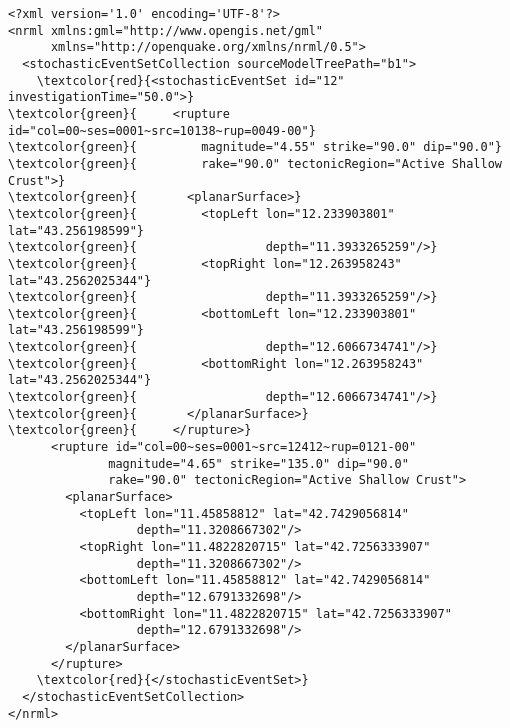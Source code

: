 \begin{Verbatim}[frame=single, commandchars=\\\{\}, fontsize=\small]
<?xml version='1.0' encoding='UTF-8'?>
<nrml xmlns:gml="http://www.opengis.net/gml"
	  xmlns="http://openquake.org/xmlns/nrml/0.5">
  <stochasticEventSetCollection sourceModelTreePath="b1">
    \textcolor{red}{<stochasticEventSet id="12" investigationTime="50.0">}
\textcolor{green}{     <rupture id="col=00~ses=0001~src=10138~rup=0049-00"}
\textcolor{green}{         magnitude="4.55" strike="90.0" dip="90.0"}
\textcolor{green}{         rake="90.0" tectonicRegion="Active Shallow Crust">}
\textcolor{green}{       <planarSurface>}
\textcolor{green}{         <topLeft lon="12.233903801" lat="43.256198599"}
\textcolor{green}{                  depth="11.3933265259"/>}
\textcolor{green}{         <topRight lon="12.263958243" lat="43.2562025344"}
\textcolor{green}{                  depth="11.3933265259"/>}
\textcolor{green}{         <bottomLeft lon="12.233903801" lat="43.256198599"}
\textcolor{green}{                  depth="12.6066734741"/>}
\textcolor{green}{         <bottomRight lon="12.263958243" lat="43.2562025344"}
\textcolor{green}{                  depth="12.6066734741"/>}
\textcolor{green}{       </planarSurface>}
\textcolor{green}{     </rupture>}
      <rupture id="col=00~ses=0001~src=12412~rup=0121-00"
              magnitude="4.65" strike="135.0" dip="90.0"
              rake="90.0" tectonicRegion="Active Shallow Crust">
        <planarSurface>
          <topLeft lon="11.45858812" lat="42.7429056814"
                  depth="11.3208667302"/>
          <topRight lon="11.4822820715" lat="42.7256333907"
                  depth="11.3208667302"/>
          <bottomLeft lon="11.45858812" lat="42.7429056814"
                  depth="12.6791332698"/>
          <bottomRight lon="11.4822820715" lat="42.7256333907"
                  depth="12.6791332698"/>
        </planarSurface>
      </rupture>
    \textcolor{red}{</stochasticEventSet>}
  </stochasticEventSetCollection>
</nrml>
\end{Verbatim}